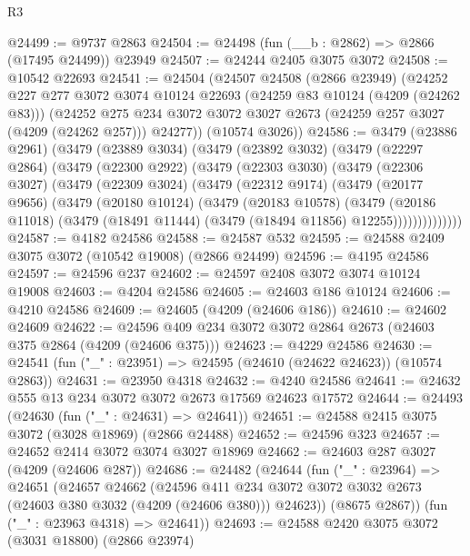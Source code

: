 \begin{lexlean}{R3}
\begin{coremodule}
@24499 := @9737 @2863
@24504 := @24498 (fun (__b : @2862) => @2866 (@17495 @24499)) @23949
@24507 := @24244 @2405 @3075 @3072
@24508 := @10542 @22693
@24541 := @24504
    (@24507
      @24508
      (@2866 @23949)
      (@24252
        @227
        @277
        @3072
        @3074
        @10124
        @22693
        (@24259 @83 @10124 (@4209 (@24262 @83)))
        (@24252 @275 @234 @3072 @3072 @3027 @2673 (@24259 @257 @3027 (@4209 (@24262 @257))) @24277))
      (@10574 @3026))
@24586 := @3479
    (@23886 @2961)
    (@3479
      (@23889 @3034)
      (@3479
        (@23892 @3032)
        (@3479
          (@22297 @2864)
          (@3479
            (@22300 @2922)
            (@3479
              (@22303 @3030)
              (@3479
                (@22306 @3027)
                (@3479
                  (@22309 @3024)
                  (@3479
                    (@22312 @9174)
                    (@3479
                      (@20177 @9656)
                      (@3479
                        (@20180 @10124)
                        (@3479
                          (@20183 @10578)
                          (@3479
                            (@20186 @11018)
                            (@3479 (@18491 @11444) (@3479 (@18494 @11856) @12255))))))))))))))
@24587 := @4182 @24586
@24588 := @24587 @532
@24595 := @24588 @2409 @3075 @3072 (@10542 @19008) (@2866 @24499)
@24596 := @4195 @24586
@24597 := @24596 @237
@24602 := @24597 @2408 @3072 @3074 @10124 @19008
@24603 := @4204 @24586
@24605 := @24603 @186 @10124
@24606 := @4210 @24586
@24609 := @24605 (@4209 (@24606 @186))
@24610 := @24602 @24609
@24622 := @24596 @409 @234 @3072 @3072 @2864 @2673 (@24603 @375 @2864 (@4209 (@24606 @375)))
@24623 := @4229 @24586
@24630 := @24541 (fun ("_" : @23951) => @24595 (@24610 (@24622 @24623)) (@10574 @2863))
@24631 := @23950 @4318
@24632 := @4240 @24586
@24641 := @24632 @555 @13 @234 @3072 @3072 @2673 @17569 @24623 @17572
@24644 := @24493 (@24630 (fun ("_" : @24631) => @24641))
@24651 := @24588 @2415 @3075 @3072 (@3028 @18969) (@2866 @24488)
@24652 := @24596 @323
@24657 := @24652 @2414 @3072 @3074 @3027 @18969
@24662 := @24603 @287 @3027 (@4209 (@24606 @287))
@24686 := @24482
    (@24644
      (fun ("_" : @23964) =>
      @24651
        (@24657
          @24662
          (@24596
            @411
            @234
            @3072
            @3072
            @3032
            @2673
            (@24603 @380 @3032 (@4209 (@24606 @380)))
            @24623))
        (@8675 @2867))
      (fun ("_" : @23963 @4318) => @24641))
@24693 := @24588 @2420 @3075 @3072 (@3031 @18800) (@2866 @23974)

\end{coremodule}
\end{lexlean}
